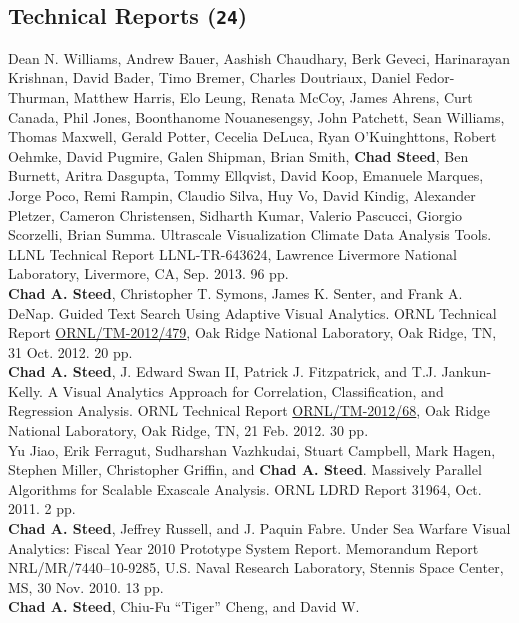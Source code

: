 \documentclass[11pt, a4paper]{article}
\newcommand{\years}[1]{\marginnote{\scriptsize #1}}
\begin{document}
\subsection*{Technical Reports (\texttt{24})}
\begin{sloppypar}
\noindent\years{2013}Dean N. Williams, Andrew Bauer, Aashish Chaudhary, Berk Geveci,
Harinarayan Krishnan, David Bader, Timo Bremer, Charles Doutriaux, Daniel Fedor-Thurman,
Matthew Harris, Elo Leung, Renata McCoy, James Ahrens, Curt Canada, Phil Jones,
Boonthanome Nouanesengsy, John Patchett, Sean Williams, Thomas Maxwell, Gerald Potter,
Cecelia DeLuca, Ryan O'Kuinghttons, Robert Oehmke, David Pugmire, Galen Shipman, Brian Smith,
\textbf{Chad Steed}, Ben Burnett, Aritra Dasgupta, Tommy Ellqvist, David Koop,
Emanuele Marques, Jorge Poco, Remi Rampin, Claudio Silva, Huy Vo, David Kindig, Alexander Pletzer,
Cameron Christensen, Sidharth Kumar, Valerio Pascucci, Giorgio Scorzelli, Brian Summa.
Ultrascale Visualization Climate Data Analysis Tools. LLNL Technical Report
LLNL-TR-643624, Lawrence Livermore National Laboratory, Livermore, CA, Sep. 2013. 96 pp.\\
\years{2012}\textbf{Chad A. Steed}, Christopher T. Symons,
James K. Senter, and Frank A. DeNap. Guided Text Search Using Adaptive
Visual Analytics. ORNL Technical Report
\href{http://info.ornl.gov/sites/publications/Files/Pub39480.pdf}{ORNL/TM-2012/479},
Oak Ridge National Laboratory, Oak Ridge, TN, 31 Oct. 2012. 20 pp.\\
\years{2012}\textbf{Chad A. Steed}, J. Edward Swan II,
Patrick J. Fitzpatrick, and T.J. Jankun-Kelly.  A Visual Analytics Approach
for Correlation, Classification, and Regression Analysis. ORNL Technical
Report \href{http://info.ornl.gov/sites/publications/Files/Pub24402.pdf}{ORNL/TM-2012/68},
Oak Ridge National Laboratory, Oak Ridge, TN,
21 Feb. 2012. 30 pp.\\
\years{2011}Yu Jiao, Erik Ferragut, Sudharshan Vazhkudai,
Stuart Campbell, Mark Hagen, Stephen Miller, Christopher Griffin, and
\textbf{Chad A. Steed}. Massively Parallel Algorithms for Scalable Exascale
Analysis. ORNL LDRD Report 31964, Oct. 2011. 2 pp.\\
\years{2010}\textbf{Chad A. Steed}, Jeffrey Russell, and J. Paquin
Fabre. Under Sea Warfare Visual Analytics: Fiscal Year 2010 Prototype System
Report. Memorandum Report NRL/MR/7440--10-9285, U.S. Naval Research
Laboratory, Stennis Space Center, MS, 30 Nov. 2010. 13 pp.\\
\years{2010}\textbf{Chad A. Steed}, Chiu-Fu ``Tiger'' Cheng, and David W.

\end{sloppypar}
\end{document}

